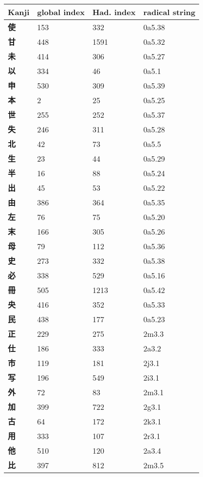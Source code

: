   \begin{longtable}[c]{llll}
    \bfseries Kanji & \bfseries global index & \bfseries Had. index & \bfseries radical string\\\hline\endhead
    \bfseries 使 & 153 & 332 & 0a5.38\\
    \bfseries 甘 & 448 & 1591 & 0a5.32\\
    \bfseries 未 & 414 & 306 & 0a5.27\\
    \bfseries 以 & 334 & 46 & 0a5.1\\
    \bfseries 申 & 530 & 309 & 0a5.39\\
    \bfseries 本 & 2 & 25 & 0a5.25\\
    \bfseries 世 & 255 & 252 & 0a5.37\\
    \bfseries 失 & 246 & 311 & 0a5.28\\
    \bfseries 北 & 42 & 73 & 0a5.5\\
    \bfseries 生 & 23 & 44 & 0a5.29\\
    \bfseries 半 & 16 & 88 & 0a5.24\\
    \bfseries 出 & 45 & 53 & 0a5.22\\
    \bfseries 由 & 386 & 364 & 0a5.35\\
    \bfseries 左 & 76 & 75 & 0a5.20\\
    \bfseries 末 & 166 & 305 & 0a5.26\\
    \bfseries 母 & 79 & 112 & 0a5.36\\
    \bfseries 史 & 273 & 332 & 0a5.38\\
    \bfseries 必 & 338 & 529 & 0a5.16\\
    \bfseries 冊 & 505 & 1213 & 0a5.42\\
    \bfseries 央 & 416 & 352 & 0a5.33\\
    \bfseries 民 & 438 & 177 & 0a5.23\\
    \bfseries 正 & 229 & 275 & 2m3.3\\
    \bfseries 仕 & 186 & 333 & 2a3.2\\
    \bfseries 市 & 119 & 181 & 2j3.1\\
    \bfseries 写 & 196 & 549 & 2i3.1\\
    \bfseries 外 & 72 & 83 & 2m3.1\\
    \bfseries 加 & 399 & 722 & 2g3.1\\
    \bfseries 古 & 64 & 172 & 2k3.1\\
    \bfseries 用 & 333 & 107 & 2r3.1\\
    \bfseries 他 & 510 & 120 & 2a3.4\\
    \bfseries 比 & 397 & 812 & 2m3.5\\

\end{longtable}
